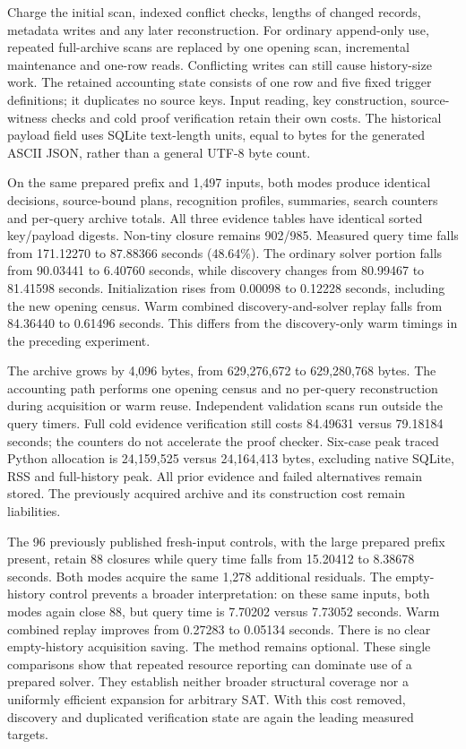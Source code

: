 \documentclass[11pt,a4paper]{article}
\numberwithin{equation}{section}
\theoremstyle{plain}
\theoremstyle{definition}
\theoremstyle{remark}
\begin{document}
Charge the initial scan, indexed conflict checks, lengths of changed records, metadata writes and any later reconstruction. For ordinary append-only use, repeated full-archive scans are replaced by one opening scan, incremental maintenance and one-row reads. Conflicting writes can still cause history-size work. The retained accounting state consists of one row and five fixed trigger definitions; it duplicates no source keys. Input reading, key construction, source-witness checks and cold proof verification retain their own costs. The historical payload field uses SQLite text-length units, equal to bytes for the generated ASCII JSON, rather than a general UTF-8 byte count.

On the same prepared prefix and 1,497 inputs, both modes produce identical decisions, source-bound plans, recognition profiles, summaries, search counters and per-query archive totals. All three evidence tables have identical sorted key/payload digests. Non-tiny closure remains 902/985. Measured query time falls from 171.12270 to 87.88366 seconds (48.64\%). The ordinary solver portion falls from 90.03441 to 6.40760 seconds, while discovery changes from 80.99467 to 81.41598 seconds. Initialization rises from 0.00098 to 0.12228 seconds, including the new opening census. Warm combined discovery-and-solver replay falls from 84.36440 to 0.61496 seconds. This differs from the discovery-only warm timings in the preceding experiment.

The archive grows by 4,096 bytes, from 629,276,672 to 629,280,768 bytes. The accounting path performs one opening census and no per-query reconstruction during acquisition or warm reuse. Independent validation scans run outside the query timers. Full cold evidence verification still costs 84.49631 versus 79.18184 seconds; the counters do not accelerate the proof checker. Six-case peak traced Python allocation is 24,159,525 versus 24,164,413 bytes, excluding native SQLite, RSS and full-history peak. All prior evidence and failed alternatives remain stored. The previously acquired archive and its construction cost remain liabilities.

The 96 previously published fresh-input controls, with the large prepared prefix present, retain 88 closures while query time falls from 15.20412 to 8.38678 seconds. Both modes acquire the same 1,278 additional residuals. The empty-history control prevents a broader interpretation: on these same inputs, both modes again close 88, but query time is 7.70202 versus 7.73052 seconds. Warm combined replay improves from 0.27283 to 0.05134 seconds. There is no clear empty-history acquisition saving. The method remains optional. These single comparisons show that repeated resource reporting can dominate use of a prepared solver. They establish neither broader structural coverage nor a uniformly efficient expansion for arbitrary SAT. With this cost removed, discovery and duplicated verification state are again the leading measured targets.
\end{document}
